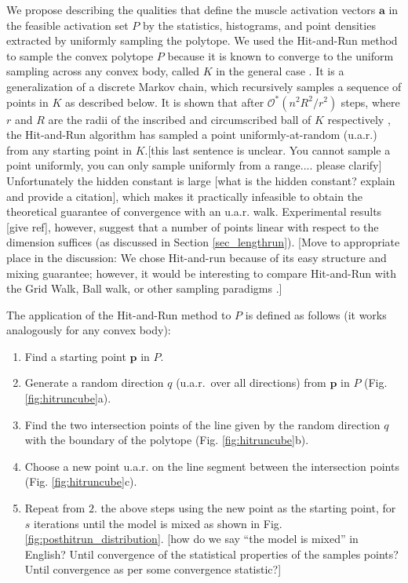 We propose  describing the qualities that define the muscle activation vectors $\textbf{a}$ in the feasible activation set $P$ by the statistics, histograms, and point densities extracted by uniformly sampling the polytope. We used the Hit-and-Run method to sample  the convex polytope $P$ because it is known to converge to the uniform sampling across any convex body, called  $K$ in the general case \cite{smith1984efficient}.
It is a generalization of a discrete Markov chain, which recursively samples a sequence of points in $K$ as described below.
It is shown that after $\mathcal{O}^*(n^2R^2/r^2)$ steps, where $r$ and $R$ are the radii of the inscribed and circumscribed ball of $K$ respectively \cite{Dyer, Lovasz}, the Hit-and-Run algorithm has sampled a point uniformly-at-random (u.a.r.) from any starting point in $K$.[this last sentence is unclear. You cannot sample a point uniformly, you can only  sample uniformly from a range.... please clarify]
Unfortunately the hidden constant is large [what is the hidden constant? explain and provide a citation], which makes it practically infeasible to obtain the theoretical guarantee of convergence  with an u.a.r. walk.
Experimental results [give ref], however, suggest that a number of points linear with respect to the dimension suffices (as discussed in Section \ref{sec_lengthrun}).
[Move to appropriate place in the discussion: We chose Hit-and-run because of its easy structure and mixing guarantee; however, it would be interesting to compare Hit-and-Run with the Grid Walk, Ball walk, or other sampling paradigms \cite{Vempala}.]

The application of the Hit-and-Run method to $P$ is defined as follows (it works analogously for any convex body):

\begin{enumerate}
\item Find a starting point $\textbf{p}$ in $P$.
\item Generate a random direction $q$ (u.a.r.\ over all directions) from $\textbf{p}$ in $P$  (Fig. \ref{fig:hitruncube}a).
\item Find the two intersection points of the line given by the random direction $q$ with the boundary of the polytope (Fig. \ref{fig:hitruncube}b).
\item Choose a new point u.a.r. on the line segment between  the intersection points (Fig. \ref{fig:hitruncube}c). 
\item Repeat from $2.$ the above steps using the new point as the starting point, for $s$ iterations until the model is mixed as shown in Fig. \ref{fig:posthitrun_distribution}. [how do we say ``the model is mixed'' in English? Until convergence of the statistical properties of the samples points? Until convergence as per some convergence statistic?]
\end{enumerate}

